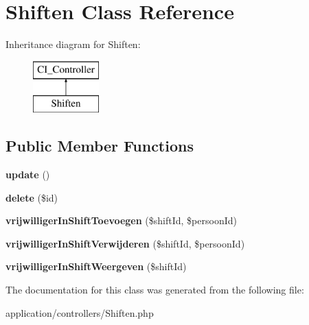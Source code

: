 \hypertarget{class_shiften}{}\section{Shiften Class Reference}
\label{class_shiften}
Inheritance diagram for Shiften\+:\begin{figure}[H]
\begin{center}
\leavevmode
\includegraphics[height=2.000000cm]{class_shiften}
\end{center}
\end{figure}
\subsection*{Public Member Functions}
\begin{DoxyCompactItemize}
\item 
\mbox{\label{class_shiften_a842e4774e3b3601a005b995c02f7e883}} 
{\bfseries update} ()
\item 
\mbox{\label{class_shiften_a2f8258add505482d7f00ea26493a5723}} 
{\bfseries delete} (\$id)
\item 
\mbox{\label{class_shiften_ab799250126ff159fd1ca9e896a57bcb6}} 
{\bfseries vrijwilliger\+In\+Shift\+Toevoegen} (\$shift\+Id, \$persoon\+Id)
\item 
\mbox{\label{class_shiften_acd0ea5b1f1b5ef6ee363916d98a261cb}} 
{\bfseries vrijwilliger\+In\+Shift\+Verwijderen} (\$shift\+Id, \$persoon\+Id)
\item 
\mbox{\label{class_shiften_acc7f0b07717791306d83399416669ef9}} 
{\bfseries vrijwilliger\+In\+Shift\+Weergeven} (\$shift\+Id)
\end{DoxyCompactItemize}


The documentation for this class was generated from the following file\+:\begin{DoxyCompactItemize}
\item 
application/controllers/Shiften.\+php\end{DoxyCompactItemize}
